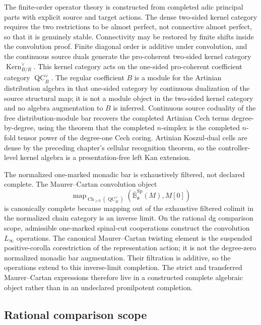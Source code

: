 The finite-order operator theory is constructed from completed adic principal
parts with explicit source and target actions.  The dense two-sided kernel
category requires the two restrictions to be almost perfect, not connective
almost perfect, so that it is genuinely stable.  Connectivity may be restored
by finite shifts inside the convolution proof.  Finite diagonal order is
additive under convolution, and the continuous source duals generate the
pro-coherent two-sided kernel category
$\operatorname{Kern}^{\vee}_{B/R}$.  This kernel category acts on the
one-sided pro-coherent coefficient category
$\operatorname{QC}^{\vee}_B$.  The regular coefficient $B$ is a module for
the Artinian distribution algebra in that one-sided category by continuous
dualization of the source structural map; it is not a module object in the
two-sided kernel category and no algebra augmentation to $B$ is inferred.
Continuous source coduality of the free distribution-module bar recovers the
completed Artinian Cech terms degree-by-degree, using the theorem that the
completed $n$-simplex is the completed $n$-fold tensor power of the
degree-one Cech coring.  Artinian Koszul-dual cells are dense by the
preceding chapter's cellular recognition theorem, so the controller-level
kernel algebra is a presentation-free left Kan extension.

The normalized one-marked monadic bar is exhaustively filtered, not declared
complete.  The Maurer--Cartan convolution object
\[
    \operatorname{map}_{
        \operatorname{Ch}_{\geq0}(\operatorname{QC}^{\vee}_B)}
    \left(
        \overline{\mathbb B}^{\mathrm{Sp}}_{\mathfrak a}(M),
        M[0]
    \right)
\]
is canonically complete because mapping out of the exhaustive filtered
colimit in the normalized chain category is an inverse limit.  On the rational dg comparison scope, admissible one-marked spinal-cut
cooperations construct the convolution $L_\infty$ operations.  The canonical
Maurer--Cartan twisting element is the suspended positive-corolla
corestriction of the representation action; it is not the degree-zero
normalized monadic bar augmentation.  Their filtration is additive, so the
operations extend to this inverse-limit completion.  The strict and
transferred Maurer--Cartan expressions therefore live in a constructed
complete algebraic object rather than in an undeclared pronilpotent
completion.

\subsection{Rational comparison scope}

